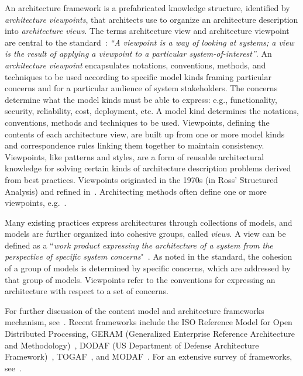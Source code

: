 An architecture framework is a prefabricated knowledge structure, identified by {\em architecture viewpoints}, that
architects use to organize an architecture description into {\em architecture views}.  The terms architecture view and architecture viewpoint are central to the standard~\cite{42010}:
{\em ``A viewpoint is a way of looking at systems; a view is the result of applying a viewpoint to a particular
system-of-interest''}. 
An {\em architecture viewpoint} encapsulates notations, conventions, methods, and techniques to
be used according to specific 
model kinds framing particular
concerns and for a particular audience of system stakeholders. 
The
concerns determine what the model kinds must be able to express: e.g.,
functionality, security, reliability, cost, deployment, etc.  
A model
kind determines the notations, conventions, methods and techniques to
be used. 
Viewpoints, defining the contents of each architecture view,
are built up from one or more model kinds and correspondence rules
linking them together to maintain consistency.
Viewpoints, like patterns and styles, are a form of reusable
architectural knowledge for solving certain kinds of architecture
description problems derived from best practices.  
Viewpoints
originated in the 1970s (in Ross' Structured Analysis) and refined in~\cite{Finkelstein+92}. Architecting methods often define one or
more viewpoints, e.g.~\cite{4+1,RozWooBook,ClementsBachmannEtAl03, Eeles-Cripps:2010}.


Many existing practices express architectures through collections of
models, and models are further organized into cohesive groups, called {\em views}. A view can be defined as a ``{\em work product expressing the architecture of a system from the perspective of specific system concerns}"~\cite{42010}.
As noted in the standard, the cohesion of a
group of models is determined by specific concerns, which are addressed by that group of models. Viewpoints refer to the conventions
for expressing an architecture with respect to a set of concerns.

For further discussion of the
content model and architecture frameworks mechanism,
see~\cite{Emery-Hilliard:2009}. 
Recent
frameworks include the ISO Reference Model for Open Distributed
Processing, GERAM (Generalized Enterprise Reference Architecture
and Methodology)~\cite{ISO15704}, DODAF (US Department of Defense Architecture
Framework)~\cite{DODAF}, TOGAF~\cite{TOGAF}, and MODAF~\cite{MODAF}. 
For an extensive survey of
frameworks, see~\cite{AFS}. 
    


